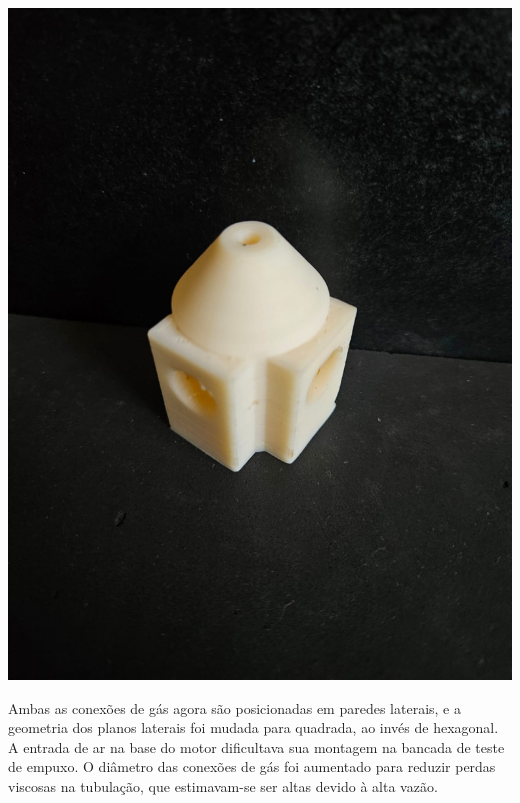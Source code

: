 \begin{minipage}{.49\textwidth}
    \includegraphics[width=\textwidth]{img/app_dev_history/motor4.jpeg}
\end{minipage}
\begin{minipage}{.49\textwidth}
    Ambas as conexões de gás agora são posicionadas em paredes laterais, e a geometria dos planos laterais foi mudada para quadrada, ao invés de hexagonal. A entrada de ar na base do motor dificultava sua montagem na bancada de teste de empuxo. O diâmetro das conexões de gás foi aumentado para reduzir perdas viscosas na tubulação, que estimavam-se ser altas devido à alta vazão.
\end{minipage}

